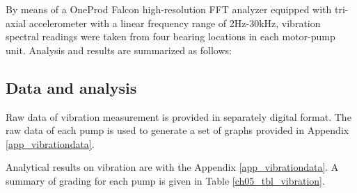 By means of a OneProd Falcon high-resolution FFT analyzer equipped with tri-axial accelerometer with a linear frequency range of 2Hz-30kHz, vibration spectral readings were taken from four bearing locations in each motor-pump unit. Analysis and results are summarized as follows:

\subsection{Data and analysis}

Raw data of vibration measurement is provided in separately digital format. The raw data of each pump is used to generate a set of graphs provided in Appendix \ref{app_vibrationdata}.

Analytical results on vibration are with the Appendix \ref{app_vibrationdata}. A summary of grading for each pump is given in Table \ref{ch05_tbl_vibration}.

